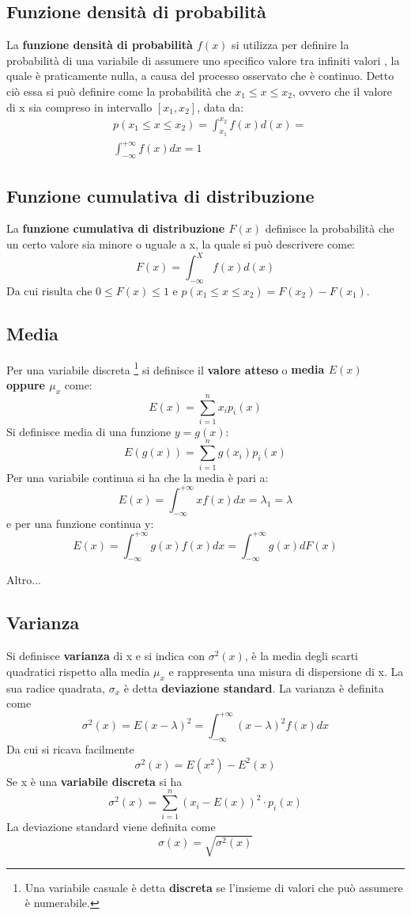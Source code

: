 \subsection{Funzione densità di probabilità}
La \textbf{funzione densità di probabilità $f(x)$} si utilizza per definire la probabilità di una variabile di assumere uno specifico valore tra infiniti valori , la quale è praticamente nulla, a causa del processo osservato che è continuo. Detto ciò essa si può definire come la probabilità che $ x_1 \leq x \leq x_2$, ovvero che il valore di x sia compreso in intervallo $[x_1, x_2]$, data da:
\begin{align*}
     & p(x_1 \leq x \leq x_2) = \int_{x_1}^{x_2}f(x) d(x)= \\
     &  \int_{-\infty }^{+ \infty} f(x) dx = 1
\end{align*}
   
\subsection{Funzione cumulativa di distribuzione}
La \textbf{funzione cumulativa di distribuzione $F(x)$} definisce la probabilità che un certo valore sia minore o uguale a x, la quale si può descrivere come:
\[ F(x) = \int_{- \infty}^{X}f(x) d(x) \]
Da cui risulta che $0 \leq F(x) \leq 1$ e $p( x_1 \leq x \leq x_2) = F(x_2) - F(x_1)$.

\subsection{Media}
Per una variabile discreta \footnote{Una variabile casuale è detta \textbf{discreta} se l'insieme di valori che può assumere è numerabile.} si definisce il \textbf{valore atteso} o \textbf{media $E(x)$ oppure $\mu_x$} come:
\[ E(x) =  \sum_{i=1}^{n} x_i p_i(x)\]
Si definisce media di una funzione $y=g(x)$:
\[ E(g(x)) = \sum_{i=1}^{n} g(x_i) p_i(x)\]
Per una variabile continua si ha che la media è pari a:
\[ E(x) = \int_{-\infty}^{+ \infty} xf(x)dx = \lambda_1 = \lambda\]
e per una funzione continua y:
\[ E(x) = \int_{-\infty}^{+ \infty} g(x)f(x)dx = \int_{-\infty}^{+ \infty} g(x)dF(x)\]

Altro...

\subsection{Varianza}
Si definisce \textbf{varianza} di x e si indica con $\sigma^2(x)$, è la media degli scarti quadratici rispetto alla media $\mu_x$ e rappresenta una misura di dispersione di x. La sua radice quadrata, $\sigma_x$ è detta \textbf{deviazione standard}. La varianza è definita come 
\[ \sigma^2(x) = E(x-\lambda)^2 = \int_{-\infty}^{+\infty}(x-\lambda)^2 f(x)dx  \]
Da cui si ricava facilmente
\[\sigma^2(x) = E(x^2) - E^2(x)\]
Se x è una \textbf{variabile discreta} si ha
\[ \sigma^2(x) = \sum_{i=1}^{n}(x_i -E(x))^2 \cdot p_i(x)\]
La deviazione standard viene definita come
\[ \sigma(x) = \sqrt{\sigma^2(x)}\]
